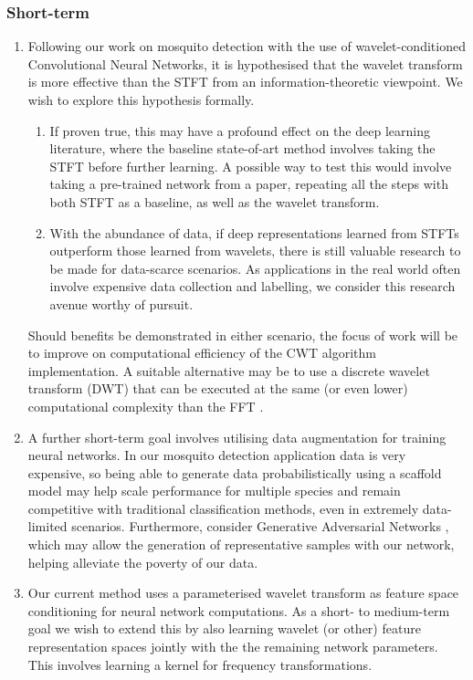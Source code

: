 \documentclass[12pt]{llncs}
\begin{document}
\subsubsection{Short-term}
\begin{enumerate}
\item Following our work on mosquito detection with the use of wavelet{}-conditioned Convolutional Neural Networks, it is hypothesised that the wavelet transform is more effective than the STFT from an information-theoretic viewpoint. We wish to explore this hypothesis formally. 
\begin{enumerate}
\item If proven true, this may have a profound effect on the deep learning literature, where the baseline state-of-art method involves taking the STFT before further learning. A possible way to test this would involve taking a pre-trained network from a paper, repeating all the steps with both STFT as a baseline, as well as the wavelet transform.
\item With the abundance of data, if deep representations learned from STFTs outperform those learned from wavelets, there is still valuable research to be made for data-scarce scenarios. As applications in the real world often involve expensive data collection and labelling, we consider this research avenue worthy of pursuit. 
\end{enumerate}
Should benefits be demonstrated in either scenario, the focus of work will be to improve on computational efficiency of the CWT algorithm implementation. A suitable alternative may be to use a discrete wavelet transform (DWT) that can be executed at the same (or even lower) computational complexity than the FFT \cite{rioul1992fast}.
\item A further short-term goal involves utilising data augmentation for training neural networks. In our mosquito detection application data is very expensive, so being able to generate data probabilistically using a scaffold model may help scale performance for multiple species and remain competitive with traditional classification methods, even in extremely data-limited scenarios. Furthermore, consider Generative Adversarial Networks \cite{radford2015unsupervised}, which may allow the generation of representative samples with our network, helping alleviate the poverty of our data. 

\item Our current method uses a parameterised wavelet transform as feature space conditioning for neural network computations. As a short- to medium-term goal we wish to extend this by also learning wavelet (or other) feature representation spaces jointly with the the remaining network parameters. This involves learning a kernel for frequency transformations. 


\end{enumerate}
\end{document}

